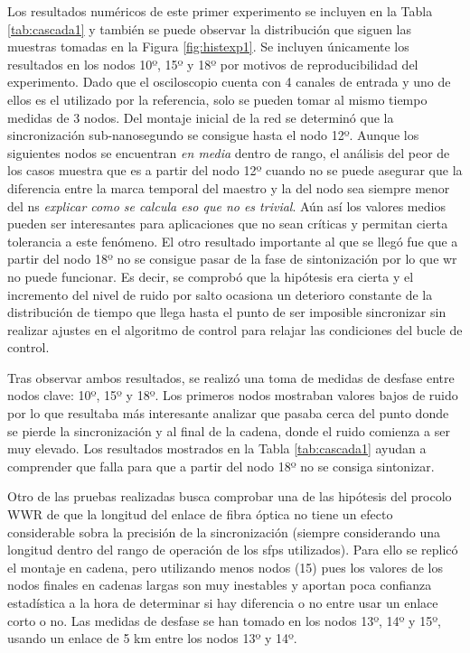 Los resultados numéricos de este primer experimento se incluyen en la Tabla 
\ref{tab:cascada1} y también se puede observar la distribución que siguen las 
muestras tomadas en la Figura \ref{fig:histexp1}. Se incluyen únicamente los 
resultados en los nodos 10º, 15º y 18º por motivos de reproducibilidad del 
experimento. Dado que el osciloscopio cuenta con 4 canales de entrada y uno de 
ellos es el utilizado por la referencia, solo se pueden tomar al mismo tiempo 
medidas de 3 nodos.
Del montaje inicial de la red se determinó que la sincronización 
sub-nanosegundo se consigue hasta el nodo 12º. Aunque los siguientes nodos se 
encuentran \textit{en media} dentro de rango, el análisis del peor de los casos 
muestra que es a partir del nodo 12º cuando no se puede asegurar que la 
diferencia entre la marca temporal del maestro y la del nodo sea siempre menor 
del ns \textit{explicar como se calcula eso que no es trivial}. Aún así los 
valores medios pueden ser interesantes para aplicaciones 
que no sean críticas y permitan cierta tolerancia a este fenómeno.
El otro resultado importante al que se llegó fue que a partir del nodo 18º no 
se consigue pasar de la fase de sintonización por lo que \gls{wr} no puede 
funcionar. Es decir, se comprobó que la hipótesis era cierta y el incremento 
del nivel de ruido por salto ocasiona un deterioro constante de la distribución 
de tiempo que llega hasta el punto de ser imposible sincronizar sin realizar 
ajustes en el algoritmo de control para relajar las condiciones del bucle de 
control.

Tras observar ambos resultados, se realizó una toma de medidas de desfase entre 
nodos clave: 10º, 15º y 18º. Los primeros nodos mostraban valores bajos de 
ruido por lo que resultaba más interesante analizar que pasaba cerca del punto 
donde se pierde la sincronización y al final de la cadena, donde el ruido 
comienza a ser muy elevado. Los resultados mostrados en la Tabla 
\ref{tab:cascada1} ayudan a comprender que falla para que a partir del nodo 18º 
no se consiga sintonizar. 


Otro de las pruebas realizadas busca comprobar una de las hipótesis del procolo 
WWR de que la longitud 
del enlace de fibra óptica no tiene un efecto considerable sobra la precisión 
de la sincronización (siempre considerando una longitud dentro del rango de 
operación de los \gls{sfp}s utilizados). Para ello se replicó el montaje en 
cadena, pero utilizando menos nodos (15) pues los valores de los nodos finales 
en cadenas largas son muy inestables y aportan poca confianza estadística a la 
hora de determinar si hay diferencia o no entre usar un enlace corto o no. Las 
medidas de desfase se han tomado en los nodos 13º, 14º y 15º, usando un enlace 
de 5 km entre los nodos 13º y 14º.

